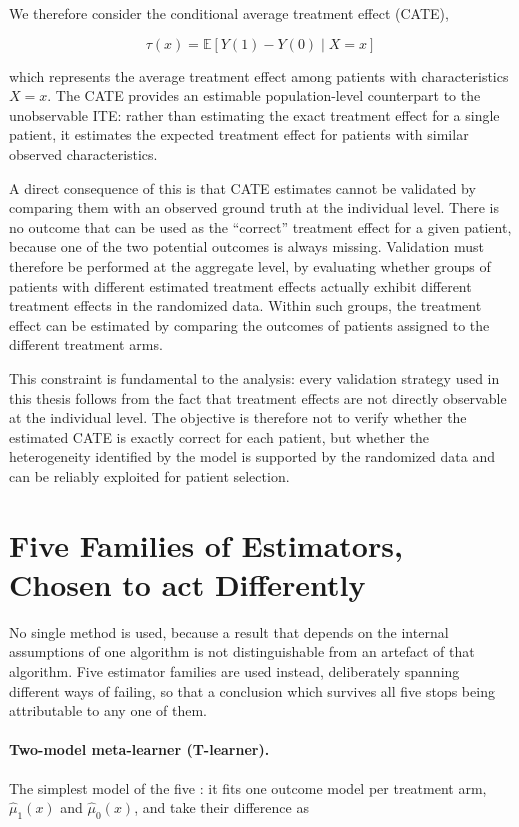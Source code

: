 We therefore consider the conditional average treatment effect (CATE),

\[
\boxed{
\tau(x) = \mathbb{E}[Y(1)-Y(0)\mid X=x]
}
\]

which represents the average treatment effect among patients with characteristics $X=x$. 
The CATE provides an estimable population-level counterpart to the unobservable ITE: 
rather than estimating the exact treatment effect for a single patient, it estimates the
expected treatment effect for patients with similar observed characteristics.

A direct consequence of this is that CATE estimates cannot be validated by 
comparing them with an observed ground truth at the individual level. There is no 
outcome that can be used as the ``correct'' treatment effect for a given patient, because
one of the two potential outcomes is always missing. Validation must therefore be 
performed at the aggregate level, by evaluating whether groups of patients with different 
estimated treatment effects actually exhibit different treatment effects in the randomized 
data. Within such groups, the treatment effect can be estimated by comparing the outcomes 
of patients assigned to the different treatment arms.

This constraint is fundamental to the analysis: every validation strategy used in this 
thesis follows from the fact that treatment effects are not directly observable at the 
individual level. The objective is therefore not to verify whether the estimated CATE 
is exactly correct for each patient, but whether the heterogeneity identified by the 
model is supported by the randomized data and can be reliably exploited for patient selection.

\section{Five Families of Estimators, Chosen to act Differently}
\label{sec:five-estimators}

No single method is used, because a result that depends on the internal
assumptions of one algorithm is not distinguishable from an artefact of that
algorithm. Five estimator families are used instead, deliberately spanning
different ways of failing, so that a conclusion which survives all five stops
being attributable to any one of them.

\paragraph{Two-model meta-learner (T-learner).}
The simplest model of the five \citep{salditt2024}: it fits one outcome model per treatment arm,
$\hat\mu_1(x)$ and $\hat\mu_0(x)$, and take their difference as

